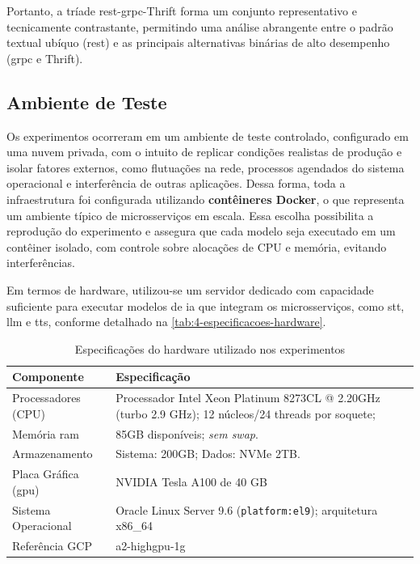 Portanto, a tríade \acrshort{rest}-\acrshort{grpc}-Thrift forma um conjunto representativo e tecnicamente contrastante, permitindo uma análise abrangente entre o padrão textual ubíquo (\acrshort{rest}) e as principais alternativas binárias de alto desempenho (\acrshort{grpc} e Thrift).

\subsection{Ambiente de Teste}

Os experimentos ocorreram em um ambiente de teste controlado, configurado em uma nuvem privada, com o intuito de replicar condições realistas de produção e isolar fatores externos, como flutuações na rede, processos agendados do sistema operacional e interferência de outras aplicações. Dessa forma, toda a infraestrutura foi configurada utilizando \textbf{contêineres Docker}, o que representa um ambiente típico de microsserviços em escala. Essa escolha possibilita a reprodução do experimento e assegura que cada modelo seja executado em um contêiner isolado, com controle sobre alocações de CPU e memória, evitando interferências.

Em termos de hardware, utilizou-se um servidor dedicado com  capacidade suficiente para executar modelos de \gls{ia} que integram os microsserviços, como \acrshort{stt}, \acrshort{llm} e \acrshort{tts}, conforme detalhado na \autoref{tab:4-especificacoes-hardware}. 

\begin{table}[H]
\centering
\caption{Especificações do hardware utilizado nos experimentos}
\label{tab:4-especificacoes-hardware}
\begin{tabularx}{\linewidth}{|l|X|}
\hline
\textbf{Componente} & \textbf{Especificação} \\
\hline
Processadores (CPU) & Processador Intel Xeon Platinum 8273CL @ 2.20GHz (turbo 2.9 GHz); 12 núcleos/24 threads por soquete; \\
\hline
Memória \acrshort{ram} & 85GB disponíveis; \textit{sem swap}. \\
\hline
Armazenamento & Sistema: 200GB; Dados: NVMe 2TB. \\
\hline
Placa Gráfica (\acrshort{gpu}) & NVIDIA Tesla A100 de 40 GB \\
\hline
Sistema Operacional & Oracle Linux Server 9.6 (\texttt{platform:el9}); arquitetura x86\_64 \\
\hline
Referência GCP & a2-highgpu-1g \\
\hline
\end{tabularx}
\end{table}


